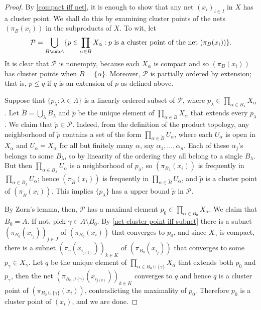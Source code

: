 \begin{proof}
By \cref{compact iff net}, it is enough to show that any net $(x_i)_{i\in I}$ in $X$ has a cluster point. We shall do this by examining cluster points of the nets $(\pi_B(x_i))$ in the subproducts of $X$. To wit, let
\[\mathcal{P}=\bigcup_{B\sub A}\{p\in\prod_{\alpha\in B}X_\alpha:\text{$p$ is a cluster point of the net $(\pi_B(x_i))$}\}.\]
It is clear that $\mathcal{P}$ is nonempty, because each $X_\alpha$ is compact and so $(\pi_B(x_i))$ has cluster points when $B=\{\alpha\}$. Moreover, $\mathcal{P}$ is partially ordered by extension; that is, $p\leq q$ if $q$ is an extension of $p$ as defined above.\par
Suppose that $\{p_\lambda:\lambda\in\Lambda\}$ is a linearly ordered subset of $\mathcal{P}$, where $p_\lambda\in\prod_{\alpha\in B_\lambda}X_\alpha$. Let $\widetilde{B}=\bigcup_\lambda B_\lambda$ and $\widetilde{p}$ be the unique element of $\prod_{\alpha\in\widetilde{B}}X_\alpha$ that extends every $p_\lambda$. We claim that $\widetilde{p}\in\mathcal{P}$. Indeed, from the definition of the product topology, any neighborhood of $\widetilde{p}$ contains a set of the form $\prod_{\alpha\in\widetilde{B}}U_\alpha$, where each $U_\alpha$ is open in $X_\alpha$ and $U_\alpha=X_\alpha$ for all but finitely many $\alpha$, say $\alpha_1,\dots,\alpha_n$. Each of these $\alpha_j$'s belongs to some $B_\lambda$, so by linearity of the ordering they all belong to a single $B_\lambda$. But then $\prod_{\alpha\in B_\lambda}U_\alpha$ is a neighborhood of $p_\lambda$, so $(\pi_{B_\lambda}(x_i))$ is frequently in $\prod_{\alpha\in B_\lambda}U_\alpha$; hence $(\pi_{\widetilde{B}}(x_i))$ is frequently in $\prod_{\alpha\in\widetilde{B}}U_\alpha$, and $\widetilde{p}$ is a cluster point of $(\pi_{\widetilde{B}}(x_i))$. This implies $\{p_\lambda\}$ has a upper bound $\widetilde{p}$ in $\mathcal{P}$.\par
By Zorn's lemma, then, $\mathcal{P}$ has a maximal element $p_0\in\prod_{\alpha\in B_0}X_\alpha$. We claim that $B_0=A$. If not, pick $\gamma\in A\setminus B_0$. By \cref{net cluster point iff subnet} there is a subnet $(\pi_{B_0}(x_{i_j}))_{j\in J}$ of $(\pi_{B_0}(x_i))$ that converges to $p_0$, and since $X_\gamma$ is compact, there is a subnet $(\pi_\gamma(x_{i_{j(k)}}))_{k\in K}$ of $(\pi_{B_0}(x_{i_j}))$ that converges to some $p_\gamma\in X_\gamma$. Let $q$ be the unique element of $\prod_{\alpha\in B_0\cup\{\gamma\}}X_\alpha$ that extends both $p_0$ and $p_\gamma$, then the net $(\pi_{B_0\cup\{\gamma\}}(x_{i_{j(k)}}))_{k\in K}$ converges to $q$ and hence $q$ is a cluster point of $(\pi_{B_0\cup\{\gamma\}}(x_i))$, contradicting the maximality of $p_0$. Therefore $p_0$ is a cluster point of $(x_i)$, and we are done.
\end{proof}

